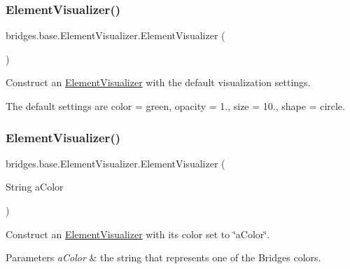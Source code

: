 \subsubsection{\texorpdfstring{ElementVisualizer()}{ElementVisualizer()}\hspace{0.1cm}{\footnotesize\ttfamily [1/6]}}
{\footnotesize\ttfamily bridges.\+base.\+Element\+Visualizer.\+Element\+Visualizer (\begin{DoxyParamCaption}{ }\end{DoxyParamCaption})}

Construct an \mbox{\hyperlink{classbridges_1_1base_1_1_element_visualizer}{Element\+Visualizer}} with the default visualization settings.

The default settings are color = green, opacity = 1., size = 10., shape = circle. \mbox{\label{classbridges_1_1base_1_1_element_visualizer_a5c0d9fe8051ebc816372b9836689fdfa}} 
\subsubsection{\texorpdfstring{ElementVisualizer()}{ElementVisualizer()}\hspace{0.1cm}{\footnotesize\ttfamily [2/6]}}
{\footnotesize\ttfamily bridges.\+base.\+Element\+Visualizer.\+Element\+Visualizer (\begin{DoxyParamCaption}\item[{String}]{a\+Color }\end{DoxyParamCaption})}

Construct an \mbox{\hyperlink{classbridges_1_1base_1_1_element_visualizer}{Element\+Visualizer}} with its color set to \char`\"{}a\+Color\char`\"{}.


\begin{DoxyParams}{Parameters}
{\em a\+Color} & the string that represents one of the Bridges colors. \\
\hline
\end{DoxyParams}
\mbox{\label{classbridges_1_1base_1_1_element_visualizer_ab62b1b06907fbeddfcee2b4b297e1021}} 
